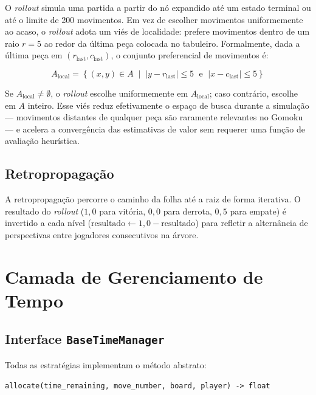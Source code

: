 \documentclass[cic,tc]{iiufrgs}
\begin{document}
O \emph{rollout} simula uma partida a partir do nó expandido até um estado terminal ou até o limite de 200 movimentos. Em vez de escolher movimentos uniformemente ao acaso, o \emph{rollout} adota um viés de localidade: prefere movimentos dentro de um raio $r = 5$ ao redor da última peça colocada no tabuleiro. Formalmente, dada a última peça em $(r_{\text{last}}, c_{\text{last}})$, o conjunto preferencial de movimentos é:

\begin{equation}
    A_{\text{local}} = \left\{ (x, y) \in A \;\middle|\; |y - r_{\text{last}}| \leq 5 \;\text{ e }\; |x - c_{\text{last}}| \leq 5 \right\}
\label{eq:locality_bias}
\end{equation}

Se $A_{\text{local}} \neq \emptyset$, o \emph{rollout} escolhe uniformemente em $A_{\text{local}}$; caso contrário, escolhe em $A$ inteiro. Esse viés reduz efetivamente o espaço de busca durante a simulação — movimentos distantes de qualquer peça são raramente relevantes no Gomoku — e acelera a convergência das estimativas de valor sem requerer uma função de avaliação heurística.

\subsection{Retropropagação}
\label{sec:impl_backprop}

A retropropagação percorre o caminho da folha até a raiz de forma iterativa. O resultado do \emph{rollout} ($1{,}0$ para vitória, $0{,}0$ para derrota, $0{,}5$ para empate) é invertido a cada nível ($\text{resultado} \leftarrow 1{,}0 - \text{resultado}$) para refletir a alternância de perspectivas entre jogadores consecutivos na árvore.

\section{Camada de Gerenciamento de Tempo}
\label{sec:impl_timemanager}

\subsection{Interface \texttt{BaseTimeManager}}
\label{sec:impl_base}

Todas as estratégias implementam o método abstrato:

\begin{center}
\texttt{allocate(time\_remaining, move\_number, board, player) -> float}
\end{center}
\end{document}
